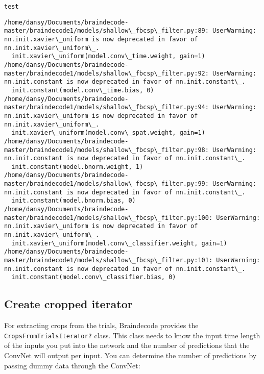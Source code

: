 \documentclass[11pt]{article}
\begin{document}
    \begin{Verbatim}[commandchars=\\\{\}]
test

    \end{Verbatim}

    \begin{Verbatim}[commandchars=\\\{\}]
/home/dansy/Documents/braindecode-master/braindecode1/models/shallow\_fbcsp\_filter.py:89: UserWarning: nn.init.xavier\_uniform is now deprecated in favor of nn.init.xavier\_uniform\_.
  init.xavier\_uniform(model.conv\_time.weight, gain=1)
/home/dansy/Documents/braindecode-master/braindecode1/models/shallow\_fbcsp\_filter.py:92: UserWarning: nn.init.constant is now deprecated in favor of nn.init.constant\_.
  init.constant(model.conv\_time.bias, 0)
/home/dansy/Documents/braindecode-master/braindecode1/models/shallow\_fbcsp\_filter.py:94: UserWarning: nn.init.xavier\_uniform is now deprecated in favor of nn.init.xavier\_uniform\_.
  init.xavier\_uniform(model.conv\_spat.weight, gain=1)
/home/dansy/Documents/braindecode-master/braindecode1/models/shallow\_fbcsp\_filter.py:98: UserWarning: nn.init.constant is now deprecated in favor of nn.init.constant\_.
  init.constant(model.bnorm.weight, 1)
/home/dansy/Documents/braindecode-master/braindecode1/models/shallow\_fbcsp\_filter.py:99: UserWarning: nn.init.constant is now deprecated in favor of nn.init.constant\_.
  init.constant(model.bnorm.bias, 0)
/home/dansy/Documents/braindecode-master/braindecode1/models/shallow\_fbcsp\_filter.py:100: UserWarning: nn.init.xavier\_uniform is now deprecated in favor of nn.init.xavier\_uniform\_.
  init.xavier\_uniform(model.conv\_classifier.weight, gain=1)
/home/dansy/Documents/braindecode-master/braindecode1/models/shallow\_fbcsp\_filter.py:101: UserWarning: nn.init.constant is now deprecated in favor of nn.init.constant\_.
  init.constant(model.conv\_classifier.bias, 0)

    \end{Verbatim}

    \subsection{Create cropped iterator}\label{create-cropped-iterator}

    For extracting crops from the trials, Braindecode provides the
\texttt{CropsFromTrialsIterator?} class. This class needs to know the
input time length of the inputs you put into the network and the number
of predictions that the ConvNet will output per input. You can determine
the number of predictions by passing dummy data through the ConvNet:
\end{document}
